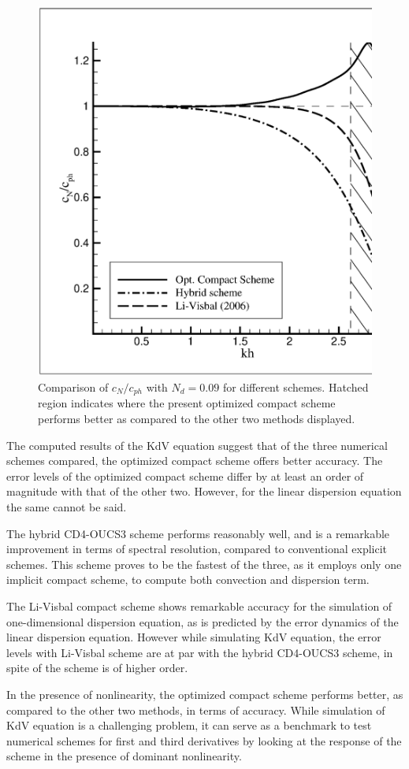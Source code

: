 \begin{figure}[!h]
\center
\includegraphics[width=0.5\linewidth]{Fig_17}
\caption{Comparison of $c_N/c_{ph}$ with $N_d = 0.09$ for different schemes. Hatched region indicates where the present optimized compact scheme
performs better as compared to the other two methods displayed.}
\label{fig:cn_cph_comp}
\end{figure}

The computed results of the KdV equation suggest that of the three numerical schemes compared, the optimized compact scheme offers better accuracy. The error levels of the optimized compact scheme differ by at least an order of magnitude with that of the other two. However, for the linear dispersion equation the same cannot be said.

 The hybrid CD4-OUCS3 scheme performs reasonably well, and is a remarkable improvement in terms of spectral resolution, compared to conventional explicit schemes. This scheme proves to be the fastest of the three, as it employs only one implicit compact scheme, to compute both convection and dispersion term.
 
 The Li-Visbal compact scheme shows remarkable accuracy for the simulation of one-dimensional dispersion equation, as is predicted by the error dynamics 
of the linear dispersion equation. However while simulating KdV equation, the error levels with Li-Visbal scheme are at par with the hybrid CD4-OUCS3 scheme, in spite of the scheme is of higher order.
 
  In the presence of nonlinearity, the optimized compact scheme performs better, as compared to the other two methods, in terms of accuracy. While simulation of KdV equation is a challenging problem, it can serve as a benchmark to test numerical schemes for first and third derivatives by looking 
at the response of the scheme in the presence of dominant nonlinearity.


%





